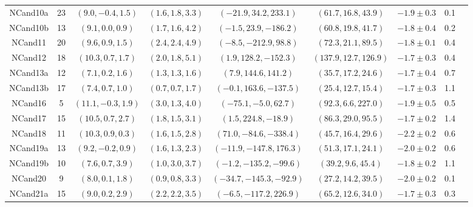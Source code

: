\begin{table}[t!]
\begin{tabularx}{0.95\textwidth}{c|cccccccc}
NCand10a & 23        & $(9.0,-0.4,1.5)$  & $(1.6,1.8,3.3)$                      & $(-21.9,34.2,233.1)$     & $(61.7,16.8,43.9)$                & $-1.9\pm 0.3$ & 0.1 \\
NCand10b & 13        & $(9.1,0.0,0.9)$   & $(1.7,1.6,4.2)$                      & $(-1.5,23.9,-186.2)$     & $(60.8,19.8,41.7)$                & $-1.8\pm 0.4$ & 0.2 \\
NCand11  & 20        & $(9.6,0.9,1.5)$   & $(2.4,2.4,4.9)$                      & $(-8.5,-212.9,98.8)$     & $(72.3,21.1,89.5)$                & $-1.8\pm 0.1$ & 0.4 \\
NCand12  & 18        & $(10.3,0.7,1.7)$  & $(2.0,1.8,5.1)$                      & $(1.9,128.2,-152.3)$     & $(137.9,12.7,126.9)$              & $-1.7\pm 0.3$ & 0.4 \\
NCand13a & 12        & $(7.1,0.2,1.6)$   & $(1.3,1.3,1.6)$                      & $(7.9,144.6,141.2)$      & $(35.7,17.2,24.6)$                & $-1.7\pm 0.4$ & 0.7 \\
NCand13b & 17        & $(7.4,0.7,1.0)$   & $(0.7,0.7,1.7)$                      & $(-0.1,163.6,-137.5)$    & $(25.4,12.7,15.4)$                & $-1.7\pm 0.3$ & 1.1 \\
NCand16  & 5         & $(11.1,-0.3,1.9)$ & $(3.0,1.3,4.0)$                      & $(-75.1,-5.0,62.7)$      & $(92.3,6.6,227.0)$                & $-1.9\pm 0.5$ & 0.5 \\
NCand17  & 15        & $(10.5,0.7,2.7)$  & $(1.8,1.5,3.1)$                      & $(1.5,224.8,-18.9)$      & $(86.3,29.0,95.5)$                & $-1.7\pm 0.2$ & 1.4 \\
NCand18  & 11        & $(10.3,0.9,0.3)$  & $(1.6,1.5,2.8)$                      & $(71.0,-84.6,-338.4)$    & $(45.7,16.4,29.6)$                & $-2.2\pm 0.2$ & 0.6 \\
NCand19a & 13        & $(9.2,-0.2,0.9)$  & $(1.6,1.3,2.3)$                      & $(-11.9,-147.8,176.3)$   & $(51.3,17.1,24.1)$                & $-2.0\pm 0.2$ & 0.6 \\
NCand19b & 10        & $(7.6,0.7,3.9)$   & $(1.0,3.0,3.7)$                      & $(-1.2,-135.2,-99.6)$    & $(39.2,9.6,45.4)$                 & $-1.8\pm 0.2$ & 1.1 \\
NCand20  & 9         & $(8.0,0.1,1.8)$   & $(0.9,0.8,3.3)$                      & $(-34.7,-145.3,-92.9)$   & $(27.2,14.2,39.5)$                & $-2.0\pm 0.2$ & 0.1 \\
NCand21a & 15        & $(9.0,0.2,2.9)$   & $(2.2,2.2,3.5)$                      & $(-6.5,-117.2,226.9)$    & $(65.2,12.6,34.0)$                & $-1.7\pm 0.3$ & 0.3 \\

\end{tabularx}
\end{table}
